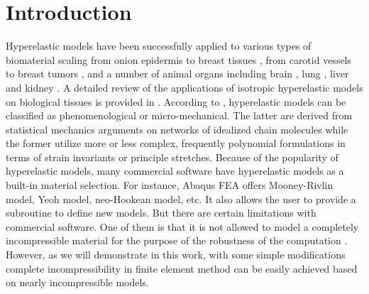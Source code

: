 \section{Introduction}
Hyperelastic models have been successfully applied to various types of biomaterial scaling from onion epidermis \cite{Qian} to breast tissues \cite{OHagen}, from carotid vessels \cite{Zidi, Zidi2, Bols} to breast tumors \cite{Oberai}, and a number of animal organs including brain \cite{Karimi, Samani, Gilchrist}, lung  \cite{Wall, Wall2}, liver and kidney \cite{Fu, Untaroiu, Willinger}. A detailed review of the applications of isotropic hyperelastic models on biological tissues is provided in \cite{Kupriyanova}.
According to \cite{Steinmann}, hyperelastic models can be classified as phenomenological or micro-mechanical. The latter are derived from statistical mechanics arguments on networks of idealized chain molecules while the former utilize more or less complex, frequently polynomial formulations in terms of strain invariants or principle stretches. Because of the popularity of hyperelastic models, many commercial software have hyperelastic models as a built-in material selection. For instance, Abaqus FEA offers Mooney-Rivlin model, Yeoh model, neo-Hookean model, etc. It also allows the user to provide a subroutine to define new models. But there are certain limitations with commercial software. One of them is that it is not allowed to model a completely incompressible material for the purpose of the robustness of the computation \cite{Abaqus}. However, as we will demonstrate in this work, with some simple modifications complete incompressibility in finite element method can be easily achieved based on nearly incompressible models.

